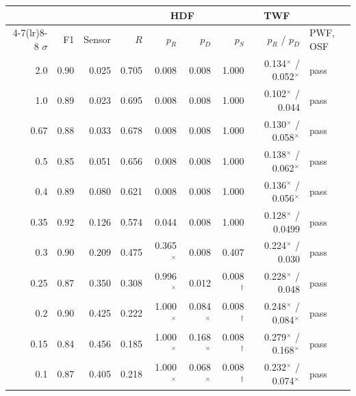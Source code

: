 \begin{tabular}{@{}rrrrrrrrl@{}}
\toprule
&&& \multicolumn{4}{c}{HDF} & \multicolumn{1}{c}{TWF} & \\
\cmidrule(lr){4-7}\cmidrule(lr){8-8}
$\sigma$ & F1 & Sensor & $R$ & $p_R$ & $p_D$ & $p_S$ & $p_R$ / $p_D$ & PWF, OSF \\
\midrule
2.0 & 0.90 & 0.025 & 0.705 & 0.008 & 0.008 & 1.000 & 0.134$^{\times}$ / 0.052$^{\times}$ & pass \\
1.0 & 0.89 & 0.023 & 0.695 & 0.008 & 0.008 & 1.000 & 0.102$^{\times}$ / 0.044 & pass \\
0.67 & 0.88 & 0.033 & 0.678 & 0.008 & 0.008 & 1.000 & 0.130$^{\times}$ / 0.058$^{\times}$ & pass \\
0.5 & 0.85 & 0.051 & 0.656 & 0.008 & 0.008 & 1.000 & 0.138$^{\times}$ / 0.062$^{\times}$ & pass \\
0.4 & 0.89 & 0.080 & 0.621 & 0.008 & 0.008 & 1.000 & 0.136$^{\times}$ / 0.056$^{\times}$ & pass \\
0.35 & 0.92 & 0.126 & 0.574 & 0.044 & 0.008 & 1.000 & 0.128$^{\times}$ / 0.0499 & pass \\
0.3 & 0.90 & 0.209 & 0.475 & 0.365$^{\times}$ & 0.008 & 0.407 & 0.224$^{\times}$ / 0.030 & pass \\
0.25 & 0.87 & 0.350 & 0.308 & 0.996$^{\times}$ & 0.012 & 0.008$^{\dagger}$ & 0.228$^{\times}$ / 0.048 & pass \\
0.2 & 0.90 & 0.425 & 0.222 & 1.000$^{\times}$ & 0.084$^{\times}$ & 0.008$^{\dagger}$ & 0.248$^{\times}$ / 0.084$^{\times}$ & pass \\
0.15 & 0.84 & 0.456 & 0.185 & 1.000$^{\times}$ & 0.168$^{\times}$ & 0.008$^{\dagger}$ & 0.279$^{\times}$ / 0.168$^{\times}$ & pass \\
0.1 & 0.87 & 0.405 & 0.218 & 1.000$^{\times}$ & 0.068$^{\times}$ & 0.008$^{\dagger}$ & 0.232$^{\times}$ / 0.074$^{\times}$ & pass \\
\bottomrule
\end{tabular}
